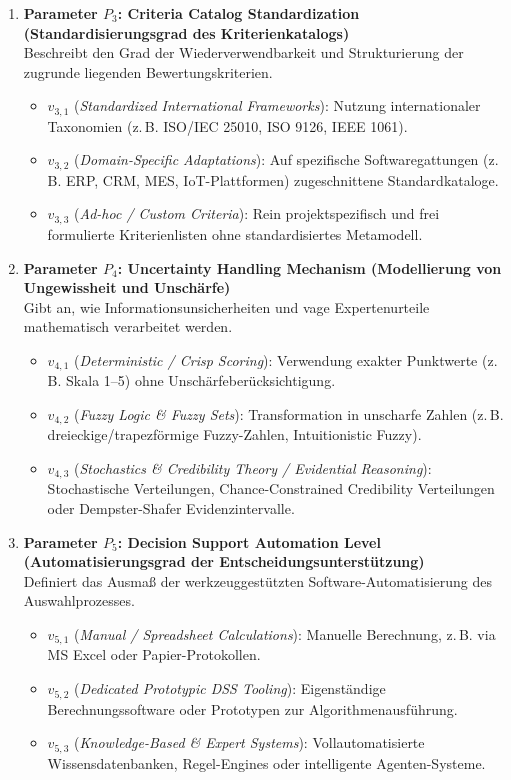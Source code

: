 \begin{enumerate}
    \item \textbf{Parameter $P_3$: Criteria Catalog Standardization (Standardisierungsgrad des Kriterienkatalogs)} \\
    Beschreibt den Grad der Wiederverwendbarkeit und Strukturierung der zugrunde liegenden Bewertungskriterien.
    \begin{itemize}
        \item $v_{3,1}$ (\textit{Standardized International Frameworks}): Nutzung internationaler Taxonomien (z.\,B. ISO/IEC 25010, ISO 9126, IEEE 1061).
        \item $v_{3,2}$ (\textit{Domain-Specific Adaptations}): Auf spezifische Softwaregattungen (z.\,B. ERP, CRM, MES, IoT-Plattformen) zugeschnittene Standardkataloge.
        \item $v_{3,3}$ (\textit{Ad-hoc / Custom Criteria}): Rein projektspezifisch und frei formulierte Kriterienlisten ohne standardisiertes Metamodell.
    \end{itemize}

    \item \textbf{Parameter $P_4$: Uncertainty Handling Mechanism (Modellierung von Ungewissheit und Unschärfe)} \\
    Gibt an, wie Informationsunsicherheiten und vage Expertenurteile mathematisch verarbeitet werden.
    \begin{itemize}
        \item $v_{4,1}$ (\textit{Deterministic / Crisp Scoring}): Verwendung exakter Punktwerte (z.\,B. Skala 1--5) ohne Unschärfeberücksichtigung.
        \item $v_{4,2}$ (\textit{Fuzzy Logic \& Fuzzy Sets}): Transformation in unscharfe Zahlen (z.\,B. dreieckige/trapezförmige Fuzzy-Zahlen, Intuitionistic Fuzzy).
        \item $v_{4,3}$ (\textit{Stochastics \& Credibility Theory / Evidential Reasoning}): Stochastische Verteilungen, Chance-Constrained Credibility Verteilungen oder Dempster-Shafer Evidenzintervalle.
    \end{itemize}

    \item \textbf{Parameter $P_5$: Decision Support Automation Level (Automatisierungsgrad der Entscheidungsunterstützung)} \\
    Definiert das Ausmaß der werkzeuggestützten Software-Automatisierung des Auswahlprozesses.
    \begin{itemize}
        \item $v_{5,1}$ (\textit{Manual / Spreadsheet Calculations}): Manuelle Berechnung, z.\,B. via MS Excel oder Papier-Protokollen.
        \item $v_{5,2}$ (\textit{Dedicated Prototypic DSS Tooling}): Eigenständige Berechnungssoftware oder Prototypen zur Algorithmenausführung.
        \item $v_{5,3}$ (\textit{Knowledge-Based \& Expert Systems}): Vollautomatisierte Wissensdatenbanken, Regel-Engines oder intelligente Agenten-Systeme.
    \end{itemize}


\end{enumerate}
